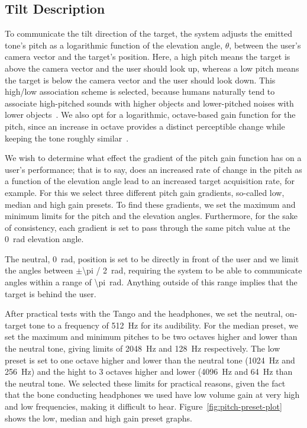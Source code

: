 \documentclass[format=sigconf, review=true, screen=true, anonymous=true]{acmart}
\begin{document}

\subsection{Tilt Description}

To communicate the tilt direction of the target, the system adjusts the emitted tone's pitch as a logarithmic function of the elevation angle, $\theta$, between the user's camera vector and the target's position. Here, a high pitch means the target is above the camera vector and the user should look up, whereas a low pitch means the target is below the camera vector and the user should look down. This high/low association scheme is selected, because humans naturally tend to associate high-pitched sounds with higher objects and lower-pitched noises with lower objects~\cite{pratt1930spatial}. We also opt for a logarithmic, octave-based gain function for the pitch, since an increase in octave provides a distinct perceptible change while keeping the tone roughly similar~\cite{shepard1964circularity}.

We wish to determine what effect the gradient of the pitch gain function has on a user's performance; that is to say, does an increased rate of change in the pitch as a function of the elevation angle lead to an increased target acquisition rate, for example. For this we select three different pitch gain gradients, so-called low, median and high gain presets. To find these gradients, we set the maximum and minimum limits for the pitch and the elevation angles. Furthermore, for the sake of consistency, each gradient is set to pass through the same pitch value at the \SI{0}{\radian} elevation angle.   

The neutral, \SI{0}{\radian}, position is set to be directly in front of the user and we limit the angles between $\pm$\SI[quotient-mode=fraction]{\pi / 2}{\radian}, requiring the system to be able to communicate angles within a range of \SI{\pi}{\radian}. Anything outside of this range implies that the target is behind the user. 

After practical tests with the Tango and the headphones, we set the neutral, on-target tone to a frequency of \SI{512}{\hertz} for its audibility. For the median preset, we set the maximum and minimum pitches to be two octaves higher and lower than the neutral tone, giving limits of \SI{2048}{\hertz} and \SI{128}{\hertz} respectively. The low preset is set to one octave higher and lower than the neutral tone (\SI{1024}{\hertz} and \SI{256}{\hertz}) and the hight to 3 octaves higher and lower (\SI{4096}{\hertz} and \SI{64}{\hertz} than the neutral tone. We selected these limits for practical reasons, given the fact that the bone conducting headphones we used have low volume gain at very high and low frequencies, making it difficult to hear. Figure~\ref{fig:pitch-preset-plot} shows the low, median and high gain preset graphs.  
\end{document}
